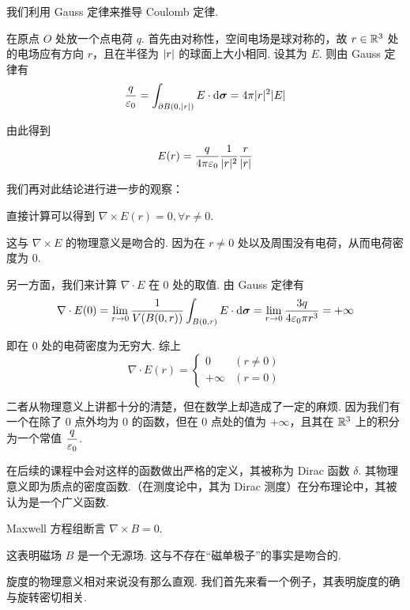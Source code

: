 \begin{example}[ Coulomb 定律]
    我们利用 Gauss 定律来推导 Coulomb 定律.

    在原点 $O$ 处放一个点电荷 $q$. 首先由对称性，空间电场是球对称的，故 $r\in\mathbb{R}^3$ 处的电场应有方向 $r$，且在半径为 $\lvert{r}\rvert$ 的球面上大小相同. 设其为 $E$. 则由 Gauss 定律有
$$
\frac{q}{\varepsilon_0}=\int_{\partial B(0,\lvert{r}\rvert)}E\cdot\mathrm{d}\bm{\sigma}=4\pi|r|^2|E|
$$

    由此得到
$$
E(r)=\frac{q}{4\pi\varepsilon_0}\frac{1}{\lvert{r}\rvert^2}\frac{r}{|r|}
$$

    我们再对此结论进行进一步的观察：

    直接计算可以得到 $\nabla\times E(r)=0,\forall r\ne 0$.

    这与 $\nabla\times E$ 的物理意义是吻合的. 因为在 $r\ne 0$ 处以及周围没有电荷，从而电荷密度为 $0$.

    另一方面，我们来计算 $\nabla\cdot E$ 在 $0$ 处的取值. 由 Gauss 定律有
$$
\nabla\cdot E(0)=\lim_{r\to 0}\frac{1}{V(B(0,r))}\int_{B(0,r)}E\cdot\mathrm{d}\bm{\sigma}=\lim_{r\to 0}\frac{3q}{4\varepsilon_0\pi r^3}=+\infty
$$

    即在 $0$ 处的电荷密度为无穷大. 综上
$$
\nabla\cdot E(r)=\begin{cases}
    0 & (r\ne 0)\\
    +\infty & (r=0)
\end{cases}
$$

    二者从物理意义上讲都十分的清楚，但在数学上却造成了一定的麻烦. 因为我们有一个在除了 $0$ 点外均为 $0$ 的函数，但在 $0$ 点处的值为 $+\infty$，且其在 $\mathbb{R}^3$ 上的积分为一个常值 $\dfrac{q}{\varepsilon_0}$.

    在后续的课程中会对这样的函数做出严格的定义，其被称为 Dirac 函数 $\delta$. 其物理意义即为质点的密度函数.（在测度论中，其为 Dirac 测度）在分布理论中，其被认为是一个广义函数.
\end{example}

\begin{example}
    Maxwell 方程组断言 $\nabla\times B=0$.

    这表明磁场 $B$ 是一个无源场. 这与不存在“磁单极子”的事实是吻合的.
\end{example}


旋度的物理意义相对来说没有那么直观. 我们首先来看一个例子，其表明旋度的确与旋转密切相关.

